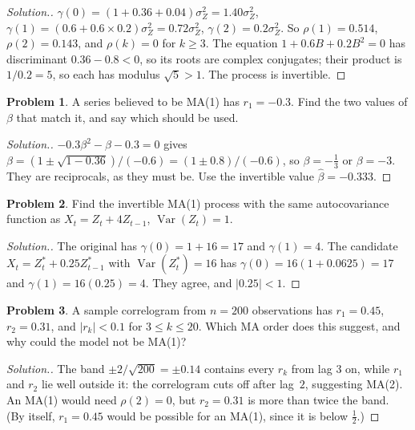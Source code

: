 \documentclass[11pt,a4paper]{article}
\theoremstyle{definition}
\newtheorem{problemx}{Problem}[subsection]
\newenvironment{problem}{\begin{problemx}}{\end{problemx}}
\newenvironment{solution}
  {\renewcommand{\qedsymbol}{}\begin{proof}[\textit{Solution}.]}
  {\end{proof}}
\DeclareMathOperator{\Var}{Var}
\begin{document}
\begin{solution}
$\gamma(0) = (1 + 0.36 + 0.04)\sigma_Z^2 = 1.40\sigma_Z^2$, $\gamma(1) = (0.6 + 0.6 \times 0.2)\sigma_Z^2 = 0.72\sigma_Z^2$, $\gamma(2) = 0.2\sigma_Z^2$. So $\rho(1) = 0.514$, $\rho(2) = 0.143$,
and $\rho(k) = 0$ for $k \ge 3$. The equation $1 + 0.6B + 0.2B^2 = 0$ has discriminant $0.36 - 0.8 < 0$, so its roots are complex conjugates;
their product is $1/0.2 = 5$, so each has modulus $\sqrt5 > 1$. The process is invertible.
\end{solution}

\begin{problem}\label{prob:ma1-negative}
A series believed to be MA(1) has $r_1 = -0.3$. Find the two values of $\beta$ that match it, and say which should be used.
\end{problem}

\begin{solution}
$-0.3\beta^2 - \beta - 0.3 = 0$ gives $\beta = (1 \pm \sqrt{1 - 0.36})/(-0.6) = (1 \pm 0.8)/(-0.6)$, so $\beta = -\frac13$ or $\beta = -3$. They are
reciprocals, as they must be. Use the invertible value $\hat\beta = -0.333$.
\end{solution}

\begin{problem}\label{prob:ma1-flip}
Find the invertible MA(1) process with the same autocovariance function as $X_t = Z_t + 4Z_{t-1}$, $\Var(Z_t) = 1$.
\end{problem}

\begin{solution}
The original has $\gamma(0) = 1 + 16 = 17$ and $\gamma(1) = 4$. The candidate $X_t = Z_t^* + 0.25Z_{t-1}^*$ with $\Var(Z_t^*) = 16$ has
$\gamma(0) = 16(1 + 0.0625) = 17$ and $\gamma(1) = 16(0.25) = 4$. They agree, and $|0.25| < 1$.
\end{solution}

\begin{problem}\label{prob:ma-cutoff}
A sample correlogram from $n = 200$ observations has $r_1 = 0.45$, $r_2 = 0.31$, and $|r_k| < 0.1$ for $3 \le k \le 20$. Which MA order does this
suggest, and why could the model not be MA(1)?
\end{problem}

\begin{solution}
The band $\pm2/\sqrt{200} = \pm0.14$ contains every $r_k$ from lag $3$ on, while $r_1$ and $r_2$ lie well outside it: the correlogram cuts off after
lag~$2$, suggesting MA(2). An MA(1) would need $\rho(2) = 0$, but $r_2 = 0.31$ is more than twice the band. (By itself, $r_1 = 0.45$ would be possible for
an MA(1), since it is below $\frac12$.)
\end{solution}
\end{document}
